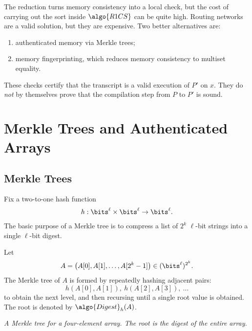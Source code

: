 \documentclass[11pt]{article}
\newcommand{\Digest}{\algo{Digest}}
\begin{document}
The reduction turns memory consistency into a local check, but the cost of carrying out
the sort inside $\algo{R1CS}$ can be quite high.  Routing networks are a valid
solution, but they are expensive.  Two better alternatives are:
\begin{enumerate}
  \item authenticated memory via Merkle trees;
  \item memory fingerprinting, which reduces memory consistency to multiset
        equality.
\end{enumerate}

\begin{remark}
These checks certify that the transcript is a valid execution of $P'$ on $x$.
They do \emph{not} by themselves prove that the compilation step from $P$ to
$P'$ is sound.
\end{remark}

\section{Merkle Trees and Authenticated Arrays}

\subsection{Merkle Trees}

Fix a two-to-one hash function
\[
  h : \bits^\ell \times \bits^\ell \to \bits^\ell.
\]
The basic purpose of a Merkle tree is to compress a list of $2^k$ $\ell$-bit
strings into a single $\ell$-bit digest.

\begin{definition}
Let
\[
  A = \bigl(A[0], A[1], \ldots, A[2^k-1]\bigr) \in (\bits^\ell)^{2^k}.
\]
The Merkle tree of $A$ is formed by repeatedly hashing adjacent pairs:
\[
  h(A[0],A[1]),\ h(A[2],A[3]),\ \ldots
\]
to obtain the next level, and then recursing until a single root value is
obtained.  The root is denoted by $\Digest_h(A)$.
\end{definition}

\begin{center}

\smallskip
\emph{A Merkle tree for a four-element array.  The root is the digest of the
entire array.}
\end{center}
\end{document}
